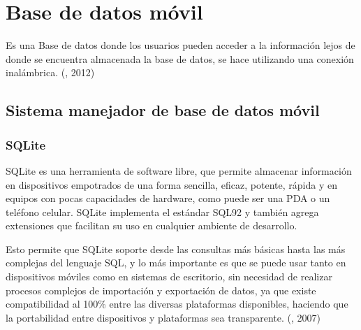
\section{Base de datos móvil} 		

Es una Base de datos donde los usuarios pueden acceder a la información lejos de donde se encuentra almacenada la base de datos, se hace utilizando una conexión inalámbrica. (\citet{bdmovil}, 2012)

\subsection{Sistema manejador de base de datos móvil} 

\subsubsection{SQLite}
\setlength{\parskip}{5mm}


SQLite es una herramienta de software libre, que permite almacenar información en dispositivos empotrados de una forma sencilla, eficaz, potente, rápida y en equipos con pocas capacidades de hardware, como puede ser una PDA o un teléfono celular. SQLite implementa el estándar SQL92 y también agrega extensiones que facilitan su uso en cualquier ambiente de desarrollo. 

Esto permite que SQLite soporte desde las consultas más básicas hasta las más complejas del lenguaje SQL, y lo más importante es que se puede usar tanto en dispositivos móviles como en sistemas de escritorio, sin necesidad de realizar procesos complejos de importación y exportación de datos, ya que existe compatibilidad al 100\% entre las diversas plataformas disponibles, haciendo que la portabilidad entre dispositivos y plataformas sea transparente. (\citet{sqlitebib}, 2007)

